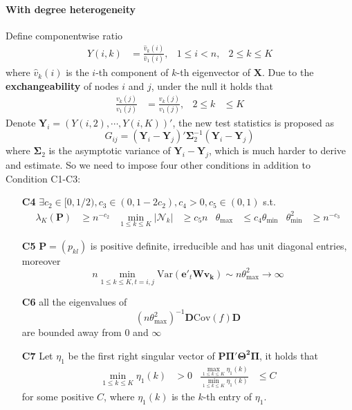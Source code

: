 \documentclass[twoside]{article}
\begin{document}
\paragraph*{With degree heterogeneity}
Define componentwise ratio 
\begin{align*}
    Y(i,k) &= \frac{\hat{v}_k (i)}{\hat{v}_1 (i)}, & 1\leq i <n,&2\leq k\leq K
\end{align*}
where $\hat{v}_k(i)$ is the $i$-th component of $k$-th eigenvector of $\mathbf{X}$. Due to the \textbf{exchangeability} of nodes $i$ and $j$,
under the null it holds that 
\begin{align*}
    \frac{v_k(j)}{v_1(j)} &= \frac{v_k(j)}{v_1(j)}, & 2\leq k&\leq K
\end{align*}
Denote $\mathbf{Y}_i = \left(Y(i,2),\cdots,Y(i,K)\right)'$, the new test statistics is proposed as 
$$
G_{ij} =\left(\mathbf{Y}_i - \mathbf{Y}_j\right)'\boldsymbol{\Sigma}_2^{-1}\left(\mathbf{Y}_i-\mathbf{Y}_j\right)
$$
where $\boldsymbol{\Sigma}_2$ is the asymptotic variance of $\mathbf{Y}_i -\mathbf{Y}_j$, which is much harder to derive and estimate. So we need to 
impose four other conditions in addition to Condition C1-C3: 
\begin{itemize}
    \item[\textbf{C4}] $\exists c_2 \in [0,1/2), c_3\in (0,1-2c_2), c_4>0, c_5\in (0,1)$ s.t. 
    \begin{align*}
        \lambda_K(\mathbf{P}) &\geq n^{-c_2} & \min_{1\leq k\leq K} \left\vert \mathcal{N}_k \right\vert & \geq c_5 n & \theta_{\max} &\leq c_4 \theta_{\min} & \theta^2_{\min} &\geq n^{-c_3}
    \end{align*}
    \item[\textbf{C5}] $\mathbf{P} = (p_{kl})$ is positive definite, irreducible and has unit diagonal entries, moreover 
    $$
        n \min_{1\leq k \leq K,t=i,j} \mathrm{Var}\left(\mathbf{e}'_t \mathbf{W v_k}\right) \sim n\theta^2_{\max} \rightarrow \infty
    $$
    \item[\textbf{C6}] all the eigenvalues of $$ \left(n\theta^2_{\max}\right)^{-1} \mathbf{D}\mathrm{Cov}(f)\mathbf{D} $$ are bounded away from 0 and $\infty$
    \item[\textbf{C7}] Let $\eta_1$ be the first right singular vector of $\mathbf{P}\boldsymbol{\Pi'\Theta^2\Pi}$, it holds that 
    \begin{align*}
        \min_{1\leq k\leq K} \eta_1(k)&>0 & \frac{\max_{1\leq k\leq K}\eta_1(k)}{\min_{1\leq k\leq K}\eta_1(k)} &\leq C
    \end{align*}
    for some positive $C$, where $\eta_1(k)$ is the $k$-th entry of $\eta_1$.
\end{itemize}
\end{document}
